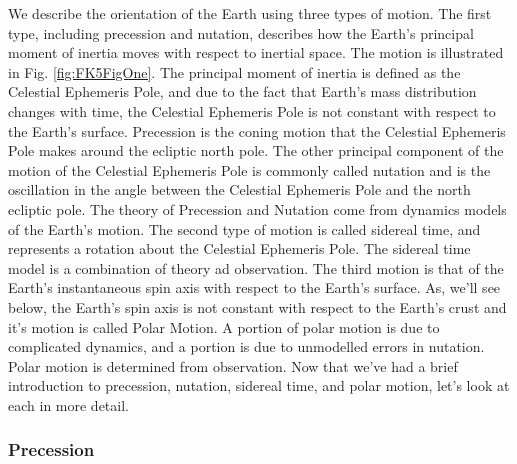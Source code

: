 We describe the orientation of the Earth using three types of
motion.  The first type, including precession and nutation,
describes how the Earth's principal moment of inertia moves with
respect to inertial space\cite{seidelmann}.  The motion is
illustrated in Fig. \ref{fig:FK5FigOne}. The principal moment of
inertia is defined as the Celestial Ephemeris Pole, and due to the fact that Earth's mass distribution
changes with time, the Celestial Ephemeris Pole is not constant with
respect to the Earth's surface. Precession is the coning motion that
the Celestial Ephemeris Pole makes around the ecliptic north pole.
The other principal component of the motion of the Celestial
Ephemeris Pole is commonly called nutation and is the oscillation in
the angle between the Celestial Ephemeris Pole and the north
ecliptic pole. The theory of Precession and Nutation come from
dynamics models of the Earth's motion.  The second type of motion is
called sidereal time, and represents a rotation about the Celestial
Ephemeris Pole. The sidereal time model is a combination of theory
ad observation. The third motion is that of the Earth's
instantaneous spin axis with respect to the Earth's surface.  As,
we'll see below, the Earth's spin axis is not constant with respect
to the Earth's crust and it's motion is called Polar Motion.  A
portion of polar motion is due to complicated dynamics, and a
portion is due to unmodelled errors in nutation. Polar motion is
determined from observation. Now that we've had a brief introduction
to precession, nutation, sidereal time, and polar motion, let's look
at each in more detail.

\subsubsection{Precession}

